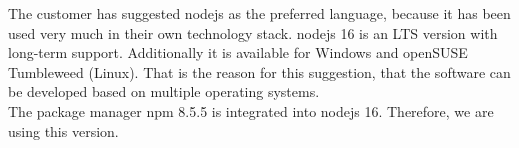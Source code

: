 \documentclass[12pt, a4paper]{article}
\begin{document}
\noindent The customer has suggested nodejs as the preferred language, because it has been used very much in their own technology stack. nodejs 16 is an LTS version with long-term support. Additionally it is available for Windows and openSUSE Tumbleweed (Linux). That is the reason for this suggestion, that the software can be developed based on multiple operating systems. \\
The package manager npm 8.5.5 is integrated into nodejs 16. Therefore, we are using this version.
\end{document}
